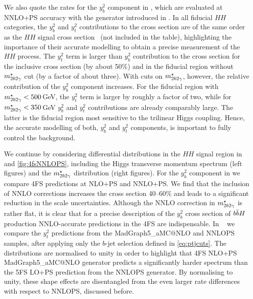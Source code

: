 \documentclass[11pt,a4paper]{article}
\begin{document}
We also quote the rates for the \bbH{} $y_b^2$ component in , which are evaluated at NNLO+PS 
accuracy with the \minnlo{} generator introduced in . 
In all fiducial $HH$ categories, the $y_b^2$ and $y_t^2$ contributions to the \bbH{} cross section are of the same order 
as the $HH$ signal cross section~\cite{manzoni:2023qaf} (not included in the table), highlighting the importance of their 
accurate modelling to obtain a precise measurement of the $HH$ process. 
The $y_t^2$ term is larger than $y_b^2$ contribution to the \bbH{} cross section for the inclusive cross section (by about 50\%) 
and in the fiducial region without $m_{2b2\gamma}^{\star}$ cut (by a factor of about three). With cuts on $m_{2b2\gamma}^{\star}$, however, the relative contribution of the 
$y_b^2$ component increases. For the fiducial region with $m_{2b2\gamma}^{\star}<500$\,GeV, the $y_t^2$ term is larger by roughly a factor of 
two, while for $m_{2b2\gamma}^{\star}<350$\,GeV $y_b^2$ and $y_t^2$ contributions are already comparably large. 
The latter is the fiducial region most sensitive to the trilinear Higgs coupling. Hence, the accurate modelling 
of both, $y_b^2$ and $y_t^2$ components, is important to fully control the \bbH{} background.

We continue by considering differential distributions in the $HH$ signal region in  and \ref{fig:4fsNNLOPS}, including 
the Higgs transverse momentum spectrum (left figures) and the $m_{2b2\gamma}^{\star}$ distribution (right figures).
For the $y_b^2$ component in  we compare 4FS predictions at NLO+PS and NNLO+PS. We find that the inclusion 
of NNLO corrections increases the cross section 40--60\% 
and leads to a significant reduction in the scale uncertainties. Although the NNLO correction in $m_{2b2\gamma}^{\star}$ is rather flat,
it is clear that for a precise description of the $y_b^2$ cross section of $b\bar{b}H{}$ production 
NNLO-accurate predictions in the 4FS are indispensable.
In ~ we compare the $y_t^2$ predictions from the {\sc MadGraph5\_aMC@NLO} and {\sc NNLOPS} samples, 
after applying only the $b$-jet selection defined in \eqref{eq:ptjcuts}. 
The distributions are normalised to unity in order to highlight that 4FS NLO+PS {\sc MadGraph5\_aMC@NLO} generator
predicts a significantly harder spectrum than the 5FS LO+PS prediction from the  {\sc NNLOPS} generator.
By normalising to unity, these shape effects are disentangled from the even larger rate differences with respect to {\sc NNLOPS}, discussed before.

\end{document}
